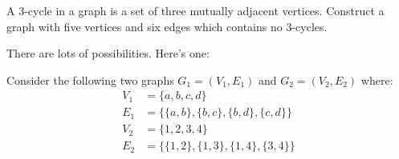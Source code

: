 \documentclass[a4paper, 12pt]{exam}
\begin{document}
\begin{questions}
\question
  A 3-cycle in a graph is a set of three mutually adjacent vertices.
  Construct a graph with five vertices and six edges which contains no 3-cycles.~\cite{biggs02}

	\begin{solution}
		There are lots of possibilities. Here's one:
		\begin{center}
  	 \begin{adjustbox}{max width=0.6\textwidth}
			\end{adjustbox}
		\end{center}

	\end{solution}

\question
  Consider the following two graphs $G_1 = (V_1,E_1)$ and $G_2 = (V_2,E_2)$ where:
  \begin{align*}
    V_1 &= \{a,b,c,d\} \\
    E_1 &= \{\{a,b\},\{b,c\},\{b,d\},\{c,d\}\}\\
    V_2 &= \{1,2,3,4\} \\
    E_2 &= \{\{1,2\},\{1,3\},\{1,4\},\{3,4\}\}
  \end{align*}

  \begin{parts}

\end{parts}
\end{questions}
\end{document}
